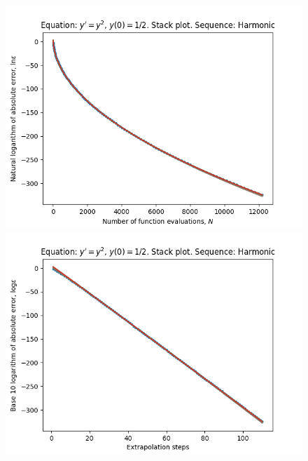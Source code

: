 \begin{figure}[H]
\centering
\begin{minipage}{0.45\textwidth}
\centering
\includegraphics[scale=0.45]{emr_plots/singularity_0_hp_harmonic_stack.png}
\end{minipage}
\begin{minipage}{0.45\textwidth}
\centering
\includegraphics[scale=0.45]{emr_plots/singularity_0_hp_harmonic_steps_stack.png}
\end{minipage}
\end{figure}

